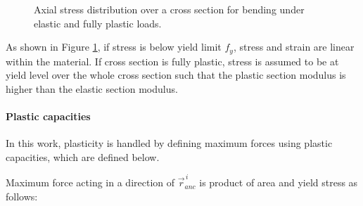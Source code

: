 \documentclass{jcgt}
\begin{document}
\begin{figure}[htb!]
\centering
{}
\hspace{1cm}
\caption{Axial stress distribution over a cross section for bending under elastic and fully plastic loads.}
\label{fig:wp}
\end{figure}

As shown in Figure \ref{fig:wp}, if stress is below yield limit $f_y$, stress and strain are linear within the material.
If cross section is fully plastic, stress is assumed to be at yield level over the whole cross section such that 
the plastic section modulus is higher than the elastic section modulus.

\paragraph{Plastic capacities}
In this work, plasticity is handled by defining maximum forces using plastic capacities, which are defined below.

Maximum force acting in a direction of $\vec{r}_{anc}^{\,i} $
is product of area and yield stress as follows:
\end{document}
